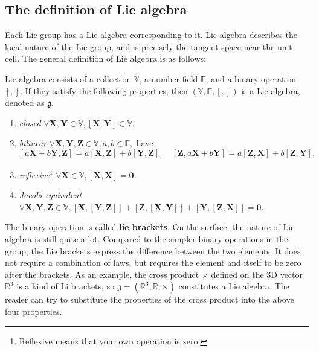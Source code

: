 \subsection{The definition of Lie algebra}

Each Lie group has a Lie algebra corresponding to it. Lie algebra describes the local nature of the Lie group, and is precisely the tangent space near the unit cell. The general definition of Lie algebra is as follows:

Lie algebra consists of a collection $\mathbb{V}$, a number field $\mathbb{F}$, and a binary operation $[,]$. If they satisfy the following properties, then $(\mathbb{V}, \mathbb{F}, [,])$ is a Lie algebra, denoted as $\mathfrak{g}$.

\begin{enumerate}
	\item{ \emph{closed} } \quad $\forall \bm{X}, \bm{Y} \in \mathbb{V}, [\bm{X}, \bm{Y}] \in \mathbb{V}$.
	\item{ \emph{bilinear} } \quad $\forall \bm{X},\bm{Y},\bm{Z} \in \mathbb{V}, a,b \in \mathbb{F}, $ have
	\[
	[a\bm{X}+b\bm{Y}, \bm{Z}] = a[\bm{X}, \bm{Z}] + b [ \bm{Y}, \bm{Z} ], \quad [\bm{Z}, a \bm{X}+b\bm{Y}] = a [\bm{Z}, \bm{X} ]+ b [\bm{Z},\bm{Y}] .
	\]
	\item{ \emph{reflexive}}\footnote{Reflexive means that your own operation is zero.} \quad $\forall \bm{X} \in \mathbb{V}, [\bm{X},\bm{X}] = \bm{0}$.
	\item { \emph{Jacobi equivalent} } \quad $\forall \bm{X},\bm{Y},\bm{Z} \in \mathbb{V}, [\bm{X}, [\bm{Y},\bm{Z}] ] + [\bm{Z}, [\bm{X},\bm{Y}] ] + [\bm{Y}, [\bm{Z},\bm{X}]] =\bm{0}$.
\end{enumerate}

The binary operation is called \textbf{lie brackets}. On the surface, the nature of Lie algebra is still quite a lot. Compared to the simpler binary operations in the group, the Lie brackets express the difference between the two elements. It does not require a combination of laws, but requires the element and itself to be zero after the brackets. As an example, the cross product $\times$ defined on the 3D vector $\mathbb{R}^3$ is a kind of Li brackets, so $\mathfrak{g} = (\mathbb{R}^3, \mathbb{R }, \times)$ constitutes a Lie algebra. The reader can try to substitute the properties of the cross product into the above four properties.
